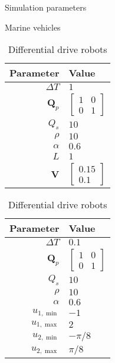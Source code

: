 \begin{table}[b]
    \begin{center}
    \captionsetup{width=.48\textwidth}
    \caption{Simulation parameters} \label{tab:handpos_MPC_params}
    
    \begin{subtable}[t]{0.22\textwidth}
        \caption{Marine vehicles}
        \label{tab:ASV}
        
        \begin{tabular}[t]{r|l}
            {\bf Parameter} & {\bf Value} \\
            \hline
            $\Delta T$ & $1$ \\
            $\bm{Q}_p$ & $\begin{bmatrix} 1 & 0 \\ 0 & 1 \end{bmatrix}$ \\
            $Q_s$ & $10$ \\
            $\rho$ & $10$ \\
            $\alpha$ & $0.6$ \\
            $L$ & $1$ \\
            $\bm{V}$ & $\begin{bmatrix} 0.15 \\ 0.1 \end{bmatrix}$
        \end{tabular}
    \end{subtable}
    \begin{subtable}[t]{0.22\textwidth}
        \caption{Differential drive robots}
        \label{tab:unicycle}
        
        \begin{tabular}[t]{r|l}
            {\bf Parameter} & {\bf Value} \\
            \hline
            $\Delta T$ & $0.1$ \\
            $\bm{Q}_p$ & $\begin{bmatrix} 1 & 0 \\ 0 & 1 \end{bmatrix}$ \\
            $Q_s$ & $10$ \\
            $\rho$ & $10$ \\
            $\alpha$ & $0.6$ \\
            $u_{1, \min}$ & $-1$ \\
            $u_{1, \max}$ & $2$ \\
            $u_{2, \min}$ & $-\pi / 8$ \\
            $u_{2, \max}$ & $\pi / 8$
        \end{tabular}
    \end{subtable}
    \end{center}
\end{table}


